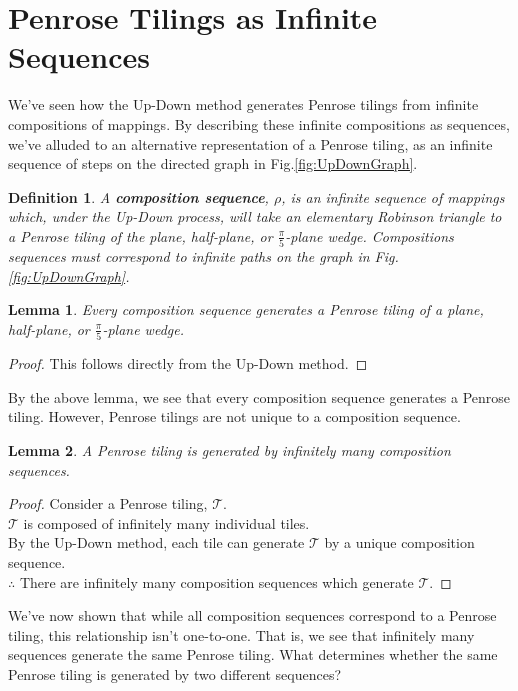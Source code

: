 \documentclass[
  oneside,
  11pt, a4paper,
  footinclude=true,
  headinclude=true,
  cleardoublepage=empty
]{scrbook}
\newtheorem{mydef}{Definition}
\newtheorem{mylem}{Lemma}
\begin{document}
\section{Penrose Tilings as Infinite Sequences}
We've seen how the Up-Down method generates Penrose tilings from infinite compositions of mappings. By describing these infinite compositions as sequences, we've alluded to an alternative representation of a Penrose tiling, as an infinite sequence of steps on the directed graph in Fig.\ref{fig:UpDownGraph}. 

\begin{mydef}
A \textbf{composition sequence}, $\rho$, is an infinite sequence of mappings which, under the Up-Down process, will take an elementary Robinson triangle to a Penrose tiling of the plane, half-plane, or $\frac{\pi}{5}$-plane wedge. Compositions sequences must correspond to infinite paths on the graph in Fig.\ref{fig:UpDownGraph}.
\end{mydef}

\begin{mylem}
Every composition sequence generates a Penrose tiling of a plane, half-plane, or $\frac{\pi}{5}$-plane wedge.
\end{mylem}

\begin{proof}
This follows directly from the Up-Down method.
\end{proof}

By the above lemma, we see that every composition sequence generates a Penrose tiling. However, Penrose tilings are not unique to a composition sequence.

\begin{mylem}
A Penrose tiling is generated by infinitely many composition sequences.
\end{mylem}

\begin{proof}
Consider a Penrose tiling, $\mathcal{T}$.\\
$\mathcal{T}$ is composed of infinitely many individual tiles.\\
By the Up-Down method, each tile can generate $\mathcal{T}$ by a unique composition sequence.\\
$\therefore$ There are infinitely many composition sequences which generate $\mathcal{T}$.
\end{proof}

We've now shown that while all composition sequences correspond to a Penrose tiling, this relationship isn't one-to-one. That is, we see that infinitely many sequences generate the same Penrose tiling. What determines whether the same Penrose tiling is generated by two different sequences?
\end{document}
